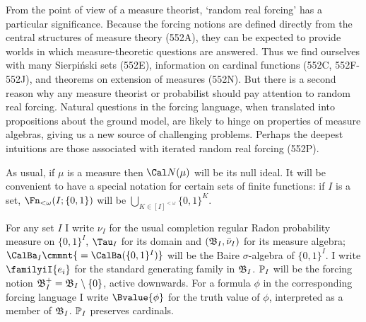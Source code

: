 
\Loadfourteens

\def\chaptername{Possible worlds}
\def\sectionname{Random reals I}

\def\BbbPk{\Bbb P_{\kappa}}
\def\eightVVdash{\mskip5mu\vrule height 6pt depth 2pt width 0.4pt
  \mskip2mu\vrule height 6pt depth 2pt width 0.4pt
  \vrule height 2.25pt depth -1.8pt width 3.2pt\mskip2mu}
\def\VVdPk{\VVdash_{\Bbb P_{\kappa}}}



From the point of view of a measure theorist, `random real forcing' has a
particular significance.   Because the forcing notions are defined directly
from the central structures of measure theory (552A), they can be
expected to provide worlds in which measure-theoretic questions are
answered.   Thus we find ourselves with many Sierpi\'nski sets (552E),
information on cardinal functions
(552C, 552F-552J), %
and theorems on extension of measures (552N).   But there is a
second reason why any measure theorist or probabilist should pay attention
to random real forcing.   Natural questions in the forcing language, when
translated into propositions about the ground model, are likely to hinge on
properties of measure algebras, giving us a new source of challenging
problems.   Perhaps the deepest intuitions are those associated with
iterated random real forcing (552P).

 As usual, if $\mu$ is a measure then
$\Cal N(\mu)$ will be its null ideal.   It
will be convenient to have a special notation for certain sets of
finite functions:  if $I$ is a set,
$\Fn_{<\omega}(I;\{0,1\})$ will be
$\bigcup_{K\in[I]^{<\omega}}\{0,1\}^K$.

For any set $I$ I write $\nu_I$
for the usual completion regular Radon probability
measure on $\{0,1\}^I$, $\Tau_I$ for its domain and
$(\frak B_I,\bar\nu_I)$ for its measure algebra;
$\CalBa_I\cmmnt{\mskip5mu=\CalBa(\{0,1\}^I)}$
will be the Baire $\sigma$-algebra of $\{0,1\}^I$.
    I
write $\familyiI{e_i}$ for the standard generating family in
$\frak B_I$.   $\Bbb P_I$ will be the forcing notion
$\frak B_I^+=\frak B_I\setminus\{0\}$, active downwards.
For a formula $\phi$
in the corresponding forcing language I write $\Bvalue{\phi}$ for the
truth value of $\phi$, interpreted as a member of
$\frak B_I$.
$\Bbb P_I$ preserves cardinals.

